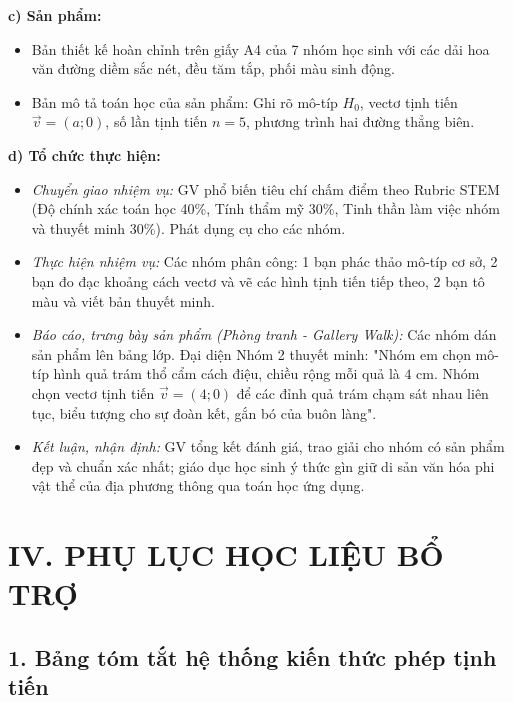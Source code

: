 \documentclass[12pt, a4paper]{article}
\renewcommand{\vec}[1]{\overrightarrow{#1}}
\begin{document}
\noindent \textbf{c) Sản phẩm:}  
\begin{itemize}[leftmargin=0.8cm]  
    \item Bản thiết kế hoàn chỉnh trên giấy A4 của 7 nhóm học sinh với các dải hoa văn đường diềm sắc nét, đều tăm tắp, phối màu sinh động.  
    \item Bản mô tả toán học của sản phẩm: Ghi rõ mô-típ $H_0$, vectơ tịnh tiến $\vec{v} = (a; 0)$, số lần tịnh tiến $n = 5$, phương trình hai đường thẳng biên.  
\end{itemize}  
  
\noindent \textbf{d) Tổ chức thực hiện:}  
\begin{itemize}[leftmargin=0.8cm]  
    \item \textit{Chuyển giao nhiệm vụ:} GV phổ biến tiêu chí chấm điểm theo Rubric STEM (Độ chính xác toán học 40\%, Tính thẩm mỹ 30\%, Tinh thần làm việc nhóm và thuyết minh 30\%). Phát dụng cụ cho các nhóm.  
    \item \textit{Thực hiện nhiệm vụ:} Các nhóm phân công: 1 bạn phác thảo mô-típ cơ sở, 2 bạn đo đạc khoảng cách vectơ và vẽ các hình tịnh tiến tiếp theo, 2 bạn tô màu và viết bản thuyết minh.  
    \item \textit{Báo cáo, trưng bày sản phẩm (Phòng tranh - Gallery Walk):} Các nhóm dán sản phẩm lên bảng lớp. Đại diện Nhóm 2 thuyết minh: "Nhóm em chọn mô-típ hình quả trám thổ cẩm cách điệu, chiều rộng mỗi quả là $4\text{ cm}$. Nhóm chọn vectơ tịnh tiến $\vec{v} = (4; 0)$ để các đỉnh quả trám chạm sát nhau liên tục, biểu tượng cho sự đoàn kết, gắn bó của buôn làng".  
    \item \textit{Kết luận, nhận định:} GV tổng kết đánh giá, trao giải cho nhóm có sản phẩm đẹp và chuẩn xác nhất; giáo dục học sinh ý thức gìn giữ di sản văn hóa phi vật thể của địa phương thông qua toán học ứng dụng.  
\end{itemize}  
  
\section*{IV. PHỤ LỤC HỌC LIỆU BỔ TRỢ}  
  
\subsection*{1. Bảng tóm tắt hệ thống kiến thức phép tịnh tiến}  
  
\end{document}
